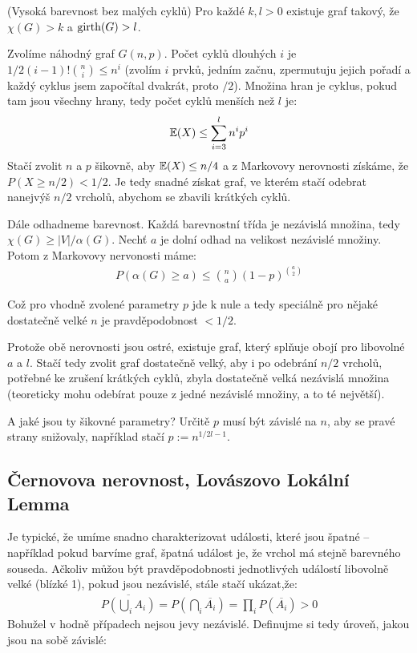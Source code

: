 \vt (Vysoká barevnost bez malých cyklů) Pro každé $k,l > 0$ existuje graf
takový, že $\chi(G) > k$ a $\operatorname{girth}(G) > l$.

\dk Zvolíme náhodný graf $G(n,p)$. Počet cyklů dlouhých $i$ je
$1/2(i-1)!\binom{n}{i}\leq n^i$ (zvolím $i$ prvků, jedním začnu, zpermutuju
jejich pořadí a každý cyklus jsem započítal dvakrát, proto $/2$). Množina hran
je cyklus, pokud tam jsou všechny hrany, tedy počet cyklů menších než $l$ je:
\begin{align}
	\mathbb{E}(X) \leq \sum_{i=3}^l n^ip^i
\end{align}
Stačí zvolit $n$ a $p$ šikovně, aby $\mathbb{E}(X) \leq n/4$ a z Markovovy nerovnosti
získáme, že $P(X \geq n/2) < 1/2$. Je tedy snadné získat graf, ve kterém stačí
odebrat nanejvýš $n/2$ vrcholů, abychom se zbavili krátkých cyklů.

Dále odhadneme barevnost. Každá barevnostní třída je nezávislá množina, tedy
$\chi(G) \geq |V| / \alpha(G)$. Nechť $a$ je dolní odhad na velikost nezávislé
množiny. Potom z Markovovy nervonosti máme:
\begin{align}
	P(\alpha(G) \geq a) \leq \binom{n}{a}(1-p)^{\binom{a}{2}}
\end{align}

Což pro vhodně zvolené parametry $p$ jde k nule a tedy speciálně pro nějaké
dostatečně velké $n$ je pravděpodobnost $< 1/2$.

Protože obě nerovnosti jsou ostré, existuje graf, který splňuje obojí pro
libovolné $a$ a $l$. Stačí tedy zvolit graf dostatečně velký, aby i po odebrání
$n/2$ vrcholů, potřebné ke zrušení krátkých cyklů, zbyla dostatečně velká
nezávislá množina (teoreticky mohu odebírat pouze z jedné nezávislé množiny, a
to té největší).

A jaké jsou ty šikovné parametry? Určitě $p$ musí být závislé na $n$, aby se
pravé strany snižovaly, například stačí $p := n^{1/2l -1}$.

\subsection{Černovova nerovnost, Lovászovo Lokální Lemma}

Je typické, že umíme snadno charakterizovat události, které jsou špatné --
například pokud barvíme graf, špatná událost je, že vrchol má stejně barevného
souseda. Ačkoliv můžou být pravděpodobnosti jednotlivých událostí libovolně
velké (blízké 1), pokud jsou nezávislé, stále stačí ukázat,že:
\begin{align}
	\overline{P\left(\bigcup_i A_i\right)} = P\left(\bigcap_i
	\overline{A_i}\right) = \prod_i P(\overline{A_i})> 0
\end{align}
Bohužel v hodně případech nejsou jevy nezávislé. Definujme si tedy úroveň, jakou
jsou na sobě závislé:


